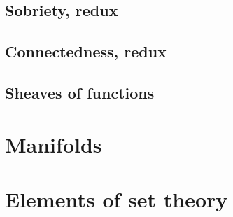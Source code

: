 \documentclass[a4paper,nobib,nols]{tufte-book}
\begin{document}
\section{Sobriety, redux}%
\label{sec:sobriety_redux}

\section{Connectedness, redux}%
\label{sec:connectedness_redux}

\section{Sheaves of functions}%
\label{sec:sheaves_of_functions}

\chapter{Manifolds}%
\label{cha:manifolds}

\appendix

\chapter{Elements of set theory}%
\label{cha:elements_of_set_theory}



\backmatter


\printbibliography[keyword=alph]
\printbibliography[heading=none, notkeyword=alph]
\end{document}
